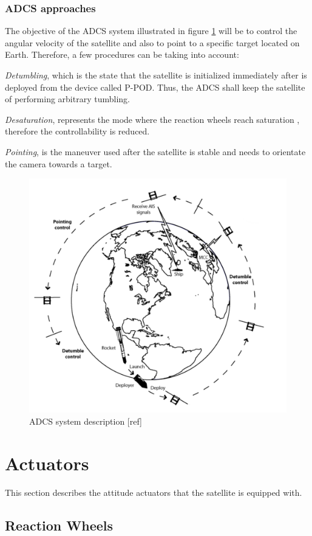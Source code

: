 \subsubsection{ADCS approaches}
The objective of the ADCS system illustrated in figure \ref{fig:cubee} will be to control the angular velocity of the satellite and also to point to a specific target located on Earth. Therefore, a few procedures can be taking into account:

\textit{Detumbling}, which is the state that the satellite is initialized immediately after is deployed from the device called P-POD. Thus, the ADCS shall keep the satellite of performing arbitrary tumbling.

\textit{Desaturation}, represents the mode where the reaction wheels reach saturation 
, therefore the controllability is reduced.

\textit{Pointing}, is the maneuver used after the satellite is stable and needs to orientate the camera towards a target.

\begin{figure}[H]
	\centering
	\includegraphics[width=0.7\linewidth]{figures/adcs}
	\caption{ADCS system description [ref]}
	\label{fig:cubee}
\end{figure}




\section{Actuators}
 This section describes the attitude actuators that the satellite is equipped with.
\subsection{Reaction Wheels}


